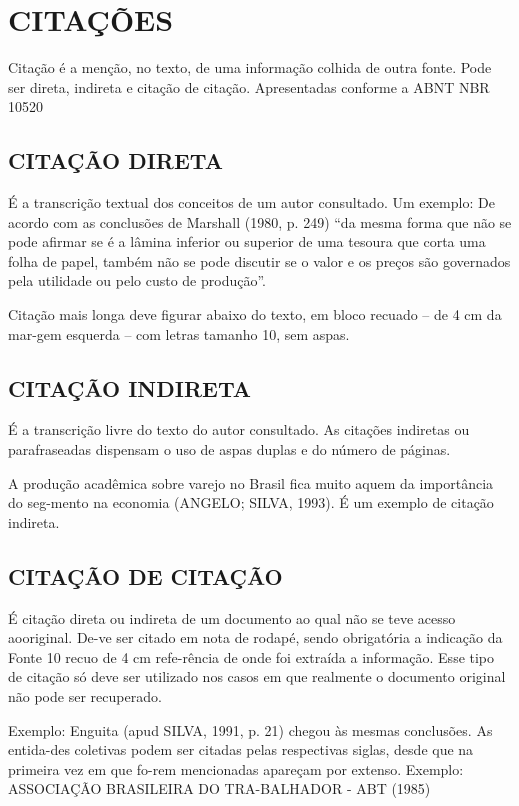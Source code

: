 %
%

\chapter{CITAÇÕES}

Citação é a menção, no texto, de uma informação colhida de outra fonte. Pode ser direta, indireta e citação de citação. Apresentadas conforme a ABNT NBR 10520

\section{CITAÇÃO DIRETA}

É a transcrição textual dos conceitos de um autor consultado. Um
exemplo: De acordo com as conclusões de Marshall (1980, p. 249) “da mesma forma que não se pode afirmar se é a lâmina inferior ou superior de uma tesoura que corta uma folha de papel, também não se pode discutir se o valor e os preços são governados pela utilidade ou pelo custo de produção”. 

Citação mais longa deve figurar abaixo do texto, em bloco recuado
– de 4 cm da mar-gem esquerda – com letras tamanho 10, sem aspas.

\section{CITAÇÃO INDIRETA}

É a transcrição livre do texto do autor consultado. As citações
indiretas ou parafraseadas dispensam o uso de aspas duplas e do número de páginas.

A produção acadêmica sobre varejo no Brasil fica muito aquem da
importância do seg-mento na economia (ANGELO; SILVA, 1993). É um exemplo de citação indireta.

\section{CITAÇÃO DE CITAÇÃO}

É citação direta ou indireta de um documento ao qual não se teve
acesso aooriginal. De-ve ser citado em nota de rodapé, sendo obrigatória a indicação da Fonte 10 recuo de 4 cm refe-rência de onde foi extraída a informação. Esse tipo de citação só deve ser utilizado nos casos em que realmente o documento original não pode ser recuperado. 

Exemplo: Enguita (apud SILVA, 1991, p. 21) chegou às mesmas
conclusões. As entida-des coletivas podem ser citadas pelas respectivas siglas, desde que na primeira vez em que fo-rem mencionadas apareçam por extenso. Exemplo: ASSOCIAÇÃO BRASILEIRA DO TRA-BALHADOR - ABT (1985)


